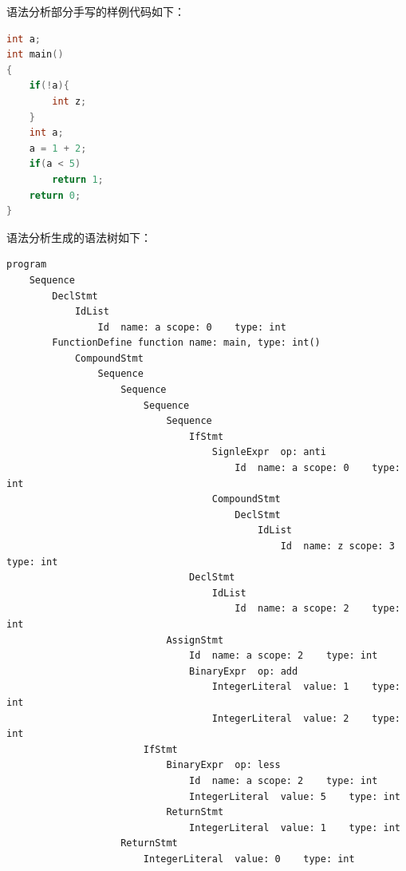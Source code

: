 \documentclass[UTF8,a4paper,10pt]{ctexart}
\begin{document}
语法分析部分手写的样例代码如下：

\begin{lstlisting}[title = 语法分析样例代码, language = c++]
int a;
int main()
{
    if(!a){
        int z;
    }
    int a;
    a = 1 + 2;
    if(a < 5)
        return 1;
    return 0;
}
\end{lstlisting}

语法分析生成的语法树如下：

\begin{lstlisting}[title = 语法分析结果]
program
    Sequence
        DeclStmt
            IdList
                Id	name: a	scope: 0	type: int
        FunctionDefine function name: main, type: int()
            CompoundStmt
                Sequence
                    Sequence
                        Sequence
                            Sequence
                                IfStmt
                                    SignleExpr	op: anti
                                        Id	name: a	scope: 0	type: int
                                    CompoundStmt
                                        DeclStmt
                                            IdList
                                                Id	name: z	scope: 3	type: int
                                DeclStmt
                                    IdList
                                        Id	name: a	scope: 2	type: int
                            AssignStmt
                                Id	name: a	scope: 2	type: int
                                BinaryExpr	op: add
                                    IntegerLiteral	value: 1	type: int
                                    IntegerLiteral	value: 2	type: int
                        IfStmt
                            BinaryExpr	op: less
                                Id	name: a	scope: 2	type: int
                                IntegerLiteral	value: 5	type: int
                            ReturnStmt
                                IntegerLiteral	value: 1	type: int
                    ReturnStmt
                        IntegerLiteral	value: 0	type: int
\end{lstlisting}










\newpage
\end{document}

